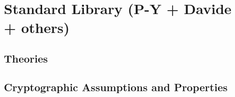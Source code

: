 
\chapter{Standard Library\label{chap:libraries} (P-Y + Davide + others)}
\section{Theories}

\section{Cryptographic Assumptions and Properties}

